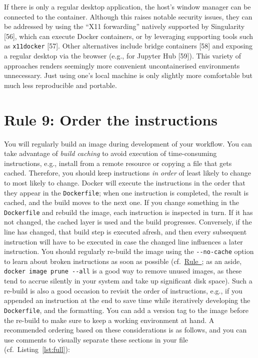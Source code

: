 \documentclass[10pt,letterpaper]{article}
\begin{document}
\normalsize

If there is only a regular desktop application, the host's window
manager can be connected to the container. Although this raises notable
security issues, they can be addressed by using the ``X11 forwarding''
natively supported by Singularity {[}56{]}, which can execute Docker
containers, or by leveraging supporting tools such as \texttt{x11docker}
{[}57{]}. Other alternatives include bridge containers {[}58{]} and
exposing a regular desktop via the browser (e.g., for Jupyter Hub
{[}59{]}). This variety of approaches renders seemingly more convenient
uncontainerised environments unnecessary. Just using one's local machine
is only slightly more comfortable but much less reproducible and
portable.

\hypertarget{rule-9-order-the-instructions}{%
\section{Rule 9: Order the
instructions}\label{rule-9-order-the-instructions}}

  \label{rule:order} 

You will regularly build an image during development of your workflow.
You can take advantage of \emph{build caching} to avoid execution of
time-consuming instructions, e.g., install from a remote resource or
copying a file that gets cached. Therefore, you should keep instructions
\emph{in order} of least likely to change to most likely to change.
Docker will execute the instructions in the order that they appear in
the \texttt{Dockerfile}; when one instruction is completed, the result
is cached, and the build moves to the next one. If you change something
in the \texttt{Dockerfile} and rebuild the image, each instruction is
inspected in turn. If it has not changed, the cached layer is used and
the build progresses. Conversely, if the line has changed, that build
step is executed afresh, and then every subsequent instruction will have
to be executed in case the changed line influences a later instruction.
You should regularly re-build the image using the \texttt{-\/-no-cache}
option to learn about broken instructions as soon as possible
(cf.~\hyperref[{rule:usage}]{Rule~}; as an aside,
\texttt{docker\ image\ prune\ -\/-all} is a good way to remove unused
images, as these tend to accrue silently in your system and take up
significant disk space). Such a re-build is also a good occasion to
revisit the order of instructions, e.g., if you appended an instruction
at the end to save time while iteratively developing the
\texttt{Dockerfile}, and the formatting. You can add a version tag to
the image before the re-build to make sure to keep a working environment
at hand. A recommended ordering based on these considerations is as
follows, and you can use comments to visually separate these sections in
your file (cf.~Listing~\ref{lst:full}):
\end{document}
